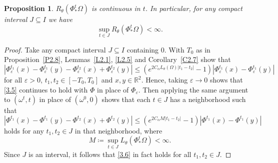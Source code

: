 \documentclass[reqno,centertags,12pt]{amsart}
\newtheorem{proposition}[theorem]{Proposition}
\theoremstyle{definition}
\numberwithin{equation}{section}
\newcommand{\abs}[1]{\left\lvert#1\right\rvert}
\newcommand{\bbR}{{\mathbb{R}}}
\newcommand{\eps}{\varepsilon}
\newcommand{\tht}{\theta}
\begin{document}
\begin{proposition}\label{P3.3}
    $R_{\tht}(\Phi_{*}^{t}\Omega)$ is continuous in $t$.   In particular,
    for any compact interval $J\subseteq I$ we have
    \[
        \sup_{t\in J}R_{\tht}(\Phi_{*}^{t}\Omega) < \infty.
    \]
\end{proposition}

\begin{proof}
    Take any compact interval $J\subseteq I$ containing $0$.
    With $T_{0}$ as in Proposition~\ref{P2.8},
    Lemmas~\ref{L2.1}, \ref{L2.5} and Corollary~\ref{C2.7} show that
    \begin{equation}\label{3.5}
        \abs{\Phi_{\eps}^{t_{1}}(x) - \Phi_{\eps}^{t_{1}}(y)
        - \Phi_{\eps}^{t_{2}}(x) + \Phi_{\eps}^{t_{2}}(y)}
        \leq (e^{2C_{\alpha}L_{\tht}(\Omega)\abs{t_{1}-t_{2}}} - 1)
        \abs{\Phi_{\eps}^{t_{1}}(x) - \Phi_{\eps}^{t_{1}}(y)}
    \end{equation}
    for all $\eps>0$, $t_{1},t_{2}\in[-T_{0},T_{0}]$ and $x,y\in\bbR^{2}$.
    Hence, taking $\eps\to 0$ shows that \eqref{3.5} continues to hold
    with $\Phi$ in place of $\Phi_{\eps}$. Then applying the same argument
    to $(\omega^{t},t)$ in place of $(\omega^{0},0)$ shows that
    each $t\in J$ has a neighborhood such that
    \begin{equation}\label{3.6}
        \abs{\Phi^{t_{1}}(x) - \Phi^{t_{1}}(y)
        - \Phi^{t_{2}}(x) + \Phi^{t_{2}}(y)}
        \leq (e^{2C_{\alpha}M\abs{t_{1}-t_{2}}} - 1)
        \abs{\Phi^{t_{1}}(x) - \Phi^{t_{1}}(y)}
    \end{equation}
    holds for any $t_{1},t_{2}\in J$ in that neighborhood, where
    \[
        M\coloneqq \sup_{t\in J}L_{\tht}(\Phi_{*}^t\Omega) < \infty.
    \]
 Since $J$ is an interval, it follows that \eqref{3.6} in fact holds for
    all $t_{1},t_{2}\in J$.


\end{proof}
\end{document}
